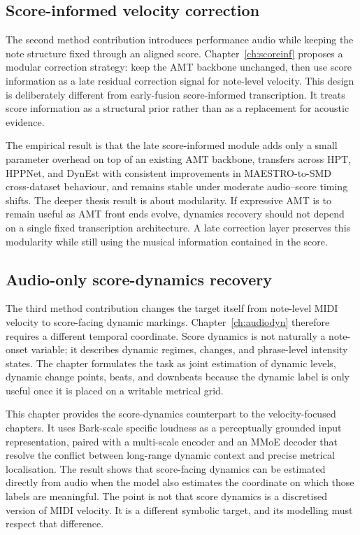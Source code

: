 \subsection{Score-informed velocity correction}
\label{ssec:conclusion:ch4}

The second method contribution introduces performance audio while keeping the note structure fixed through an aligned score. Chapter~\ref{ch:scoreinf} proposes a modular correction strategy: keep the AMT backbone unchanged, then use score information as a late residual correction signal for note-level velocity. This design is deliberately different from early-fusion score-informed transcription. It treats score information as a structural prior rather than as a replacement for acoustic evidence.

The empirical result is that the late score-informed module adds only a small parameter overhead on top of an existing AMT backbone, transfers across HPT, HPPNet, and DynEst with consistent improvements in MAESTRO-to-SMD cross-dataset behaviour, and remains stable under moderate audio--score timing shifts. The deeper thesis result is about modularity. If expressive AMT is to remain useful as AMT front ends evolve, dynamics recovery should not depend on a single fixed transcription architecture. A late correction layer preserves this modularity while still using the musical information contained in the score.

\subsection{Audio-only score-dynamics recovery}
\label{ssec:conclusion:ch5}

The third method contribution changes the target itself from note-level MIDI velocity to score-facing dynamic markings. Chapter~\ref{ch:audiodyn} therefore requires a different temporal coordinate. Score dynamics is not naturally a note-onset variable; it describes dynamic regimes, changes, and phrase-level intensity states. The chapter formulates the task as joint estimation of dynamic levels, dynamic change points, beats, and downbeats because the dynamic label is only useful once it is placed on a writable metrical grid.

This chapter provides the score-dynamics counterpart to the velocity-focused chapters. It uses Bark-scale specific loudness as a perceptually grounded input representation, paired with a multi-scale encoder and an MMoE decoder that resolve the conflict between long-range dynamic context and precise metrical localisation. The result shows that score-facing dynamics can be estimated directly from audio when the model also estimates the coordinate on which those labels are meaningful. The point is not that score dynamics is a discretised version of MIDI velocity. It is a different symbolic target, and its modelling must respect that difference.

